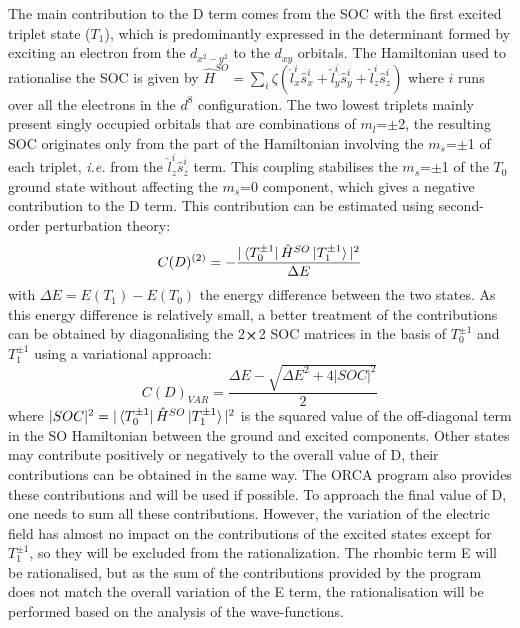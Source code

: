 \documentclass[12pt,a4paper]{report}
\numberwithin{equation}{section}
\begin{document}
The main contribution to the D term comes from the SOC with the first excited triplet state ($T_1$), which is predominantly expressed in the determinant formed by exciting an electron from the $d_{x^2-y^2}$ to the $d_{xy}$ orbitals.
The Hamiltonian used to rationalise the SOC is given by $\hat{H}^{SO}=\sum_{i} \zeta(\hat{l}_x^i\hat{s}_x^i+\hat{l}_y^i\hat{s}_y^i+\hat{l}_z^i\hat{s}_z^i)$ where $i$ runs over all the electrons in the $d^8$ configuration.
The two lowest triplets mainly present singly occupied orbitals that are combinations of $m_l$=$\pm$2, the resulting SOC originates only from the part of the Hamiltonian involving the $m_s$=$\pm$1 of each triplet, \textit{i.e.} from the $\hat{l}_z^i\hat{s}_z^i$ term.
This coupling stabilises the $m_s$=$\pm$1 of the $T_0$ ground state without affecting the $m_s$=0 component, which gives a negative contribution to the D term.
This contribution can be estimated using second-order perturbation theory:
\begin{equation}\label{ContrPert}
    C(D)^{(2)}=-\frac{|\bra{T_0^{\pm1}}\hat{H}^{SO}\ket{T_1^{\pm1}}|^2}{\Delta E}
\end{equation}
with $\Delta E = E(T_1)-E(T_0)$ the energy difference between the two states.
As this energy difference is relatively small, a better treatment of the contributions can be obtained by diagonalising the 2$\cross$2 SOC matrices in the basis of $T_0^{\pm1}$ and $T_1^{\pm1}$ using a variational approach:
\begin{equation}
    C(D)_{VAR}=\frac{\Delta E -\sqrt{\Delta E^2+4|SOC|^2}}{2}
\end{equation}
where $|SOC|^2={|\bra{T_0^{\pm1}}\hat{H}^{SO}\ket{T_1^{\pm1}}|^2}$ is the squared value of the off-diagonal term in the SO Hamiltonian between the ground and excited components.
Other states may contribute positively or negatively to the overall value of D, their contributions can be obtained in the same way. 
The ORCA program also provides these contributions and will be used if possible. To approach the final value of D, one needs to sum all these contributions.
However, the variation of the electric field has almost no impact on the contributions of the excited states except for $T_1^{\pm1}$, so they will be excluded from the rationalization.
The rhombic term E will be rationalised, but as the sum of the contributions provided by the program does not match the overall variation of the E term, the rationalisation will be performed based on the analysis of the wave-functions.
\end{document}
